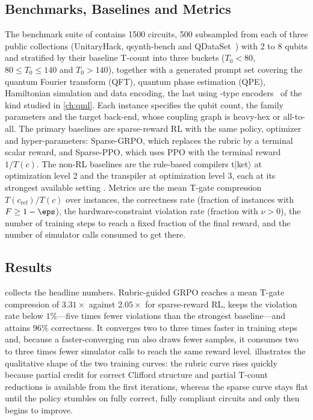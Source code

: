 \subsection{Benchmarks, Baselines and Metrics}\label{sec:syn:setup}

The benchmark suite of \cite{guo2026rubriq} contains \num{1500} circuits, 500 subsampled from each of three public collections (UnitaryHack, qsynth-bench and QDataSet~\cite{perrier2022qdataset}) with 2 to 8 qubits and stratified by their baseline T-count into three buckets ($T_0<80$, $80\le T_0\le 140$ and $T_0>140$), together with a generated prompt set covering the quantum Fourier transform (QFT), quantum phase estimation (QPE), Hamiltonian simulation and data encoding, the last using \qcrank{}-type encoders~\cite{balewski2024qcrank} of the kind studied in \cref{ch:qml}. Each instance specifies the qubit count, the family parameters and the target back-end, whose coupling graph is heavy-hex or all-to-all. The primary baselines are sparse-reward RL with the same policy, optimizer and hyper-parameters: Sparse-GRPO, which replaces the rubric by a terminal scalar reward, and Sparse-PPO, which uses PPO with the terminal reward $1/T(c)$. The non-RL baselines are the rule-based compilers t$|$ket$\rangle$ at optimization level 2 and the \qiskit{} transpiler at optimization level 3, each at its strongest available setting \cite{guo2026rubriq}. Metrics are the mean T-gate compression $T(c_{\mathrm{ref}})/T(c)$ over instances, the correctness rate (fraction of instances with $F\ge 1-\eps$), the hardware-constraint violation rate (fraction with $\nu>0$), the number of training steps to reach a fixed fraction of the final reward, and the number of simulator calls consumed to get there.

\subsection{Results}\label{sec:syn:mainresults}

 collects the headline numbers. Rubric-guided GRPO reaches a mean T-gate compression of $3.31\times$ against $2.05\times$ for sparse-reward RL, keeps the violation rate below $1\%$---five times fewer violations than the strongest baseline---and attains $96\%$ correctness. It converges two to three times faster in training steps and, because a faster-converging run also draws fewer samples, it consumes two to three times fewer simulator calls to reach the same reward level.  illustrates the qualitative shape of the two training curves: the rubric curve rises quickly because partial credit for correct Clifford structure and partial T-count reductions is available from the first iterations, whereas the sparse curve stays flat until the policy stumbles on fully correct, fully compliant circuits and only then begins to improve.

